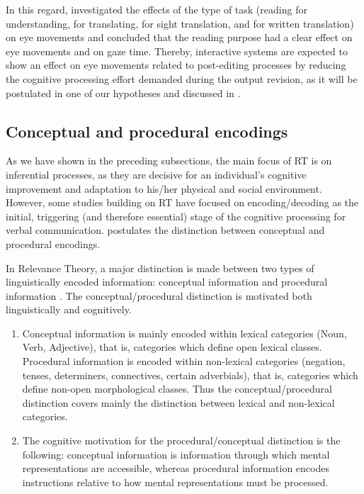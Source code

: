 \documentclass[output=paper]{langsci/langscibook}
\begin{document}
In this regard, \citet{jakobsen2008} investigated the effects of the type of task (reading for understanding, for translating, for sight translation, and for written translation) on eye movements and concluded that the reading purpose had a clear effect on eye movements and on gaze time. Thereby, interactive systems are expected to show an effect on eye movements related to post-editing processes by reducing the cognitive processing effort demanded during the output revision, as it will be postulated in one of our hypotheses and discussed in .


\subsection{Conceptual and procedural encodings\label{alves:sec:ConceptualAndProceduralEncodings}}

As we have shown in the preceding subsections, the main focus of RT is on inferential processes, as they are decisive for an individual's cognitive improvement and adaptation to his/her physical and social environment. However, some studies building on RT \citep[e.g.][]{moeschler1998, blakemore2002, Wilson2011, alves2003, alves2013} have focused on encoding/decoding as the initial, triggering (and therefore essential) stage of the cognitive processing for verbal communication. \citet{moeschler1998} postulates the distinction between conceptual and procedural encodings.


In Relevance Theory, a major distinction is made between two types of linguistically encoded information: conceptual information and procedural information \citep{wilson1993}. The conceptual/procedural distinction is motivated both linguistically and cognitively.

\begin{enumerate}

\item Conceptual information is mainly encoded within lexical categories (Noun, Verb, Adjective), that is, categories which define open lexical classes. Procedural information is encoded within non-lexical categories (negation, tenses, determiners, connectives, certain adverbials), that is, categories which define non-open morphological classes. Thus the conceptual/procedural distinction covers mainly the distinction between lexical and non-lexical categories.



\item  The cognitive motivation for the procedural/conceptual distinction is the following: conceptual information is information through which mental representations are accessible, whereas procedural information encodes instructions relative to how mental representations must be processed. \citep[1]{moeschler1998}

\end{enumerate}
\end{document}
